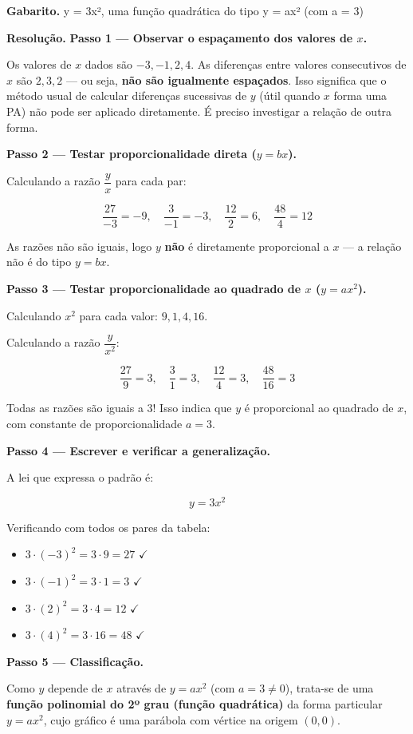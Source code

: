 \documentclass[11pt,a4paper]{article}
\begin{document}
\textbf{Gabarito.} y = 3x², uma função quadrática do tipo y = ax² (com a = 3)

\textbf{Resolução.} \textbf{Passo 1 — Observar o espaçamento dos valores de $x$.}

Os valores de $x$ dados são $-3, -1, 2, 4$. As diferenças entre valores consecutivos de $x$ são $2, 3, 2$ — ou seja, \textbf{não são igualmente espaçados}. Isso significa que o método usual de calcular diferenças sucessivas de $y$ (útil quando $x$ forma uma PA) não pode ser aplicado diretamente. É preciso investigar a relação de outra forma.

\textbf{Passo 2 — Testar proporcionalidade direta ($y = bx$).}

Calculando a razão $\dfrac{y}{x}$ para cada par:

$$\frac{27}{-3}=-9,\quad \frac{3}{-1}=-3,\quad \frac{12}{2}=6,\quad \frac{48}{4}=12$$

As razões não são iguais, logo $y$ \textbf{não} é diretamente proporcional a $x$ — a relação não é do tipo $y=bx$.

\textbf{Passo 3 — Testar proporcionalidade ao quadrado de $x$ ($y = ax^2$).}

Calculando $x^2$ para cada valor: $9, 1, 4, 16$.

Calculando a razão $\dfrac{y}{x^2}$:

$$\frac{27}{9}=3,\quad \frac{3}{1}=3,\quad \frac{12}{4}=3,\quad \frac{48}{16}=3$$

Todas as razões são iguais a $3$! Isso indica que $y$ é proporcional ao quadrado de $x$, com constante de proporcionalidade $a=3$.

\textbf{Passo 4 — Escrever e verificar a generalização.}

A lei que expressa o padrão é:

$$y = 3x^2$$

Verificando com todos os pares da tabela:
\begin{itemize}[nosep,leftmargin=*]
\item $3\cdot(-3)^2 = 3\cdot 9 = 27$ $\checkmark$
\item $3\cdot(-1)^2 = 3\cdot 1 = 3$ $\checkmark$
\item $3\cdot(2)^2 = 3\cdot 4 = 12$ $\checkmark$
\item $3\cdot(4)^2 = 3\cdot 16 = 48$ $\checkmark$
\end{itemize}

\textbf{Passo 5 — Classificação.}

Como $y$ depende de $x$ através de $y=ax^2$ (com $a=3\neq 0$), trata-se de uma \textbf{função polinomial do 2º grau (função quadrática)} da forma particular $y=ax^2$, cujo gráfico é uma parábola com vértice na origem $(0,0)$.
\end{document}
